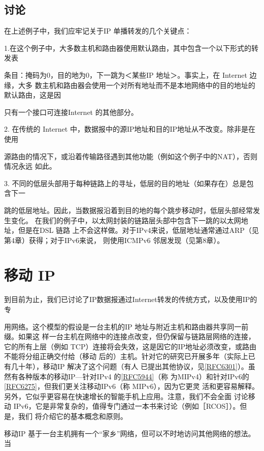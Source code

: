 \subsection{讨论}
在上述例子中，我们应牢记关于IP 单播转发的几个关键点：

1.在这个例子中，大多数主机和路由器使用默认路由，其中包含一个以下形式的转发表

条目：掩码为0，目的地为0，下一跳为＜某些IP 地址＞。事实上，在 Internet 边缘，大多
数主机和路由器会使用一个对所有地址而不是本地网络中的目的地址的默认路由，这是因

只有一个接口可连接Internet 的其他部分。

2. 在传统的 Internet 中，数据报中的源IP地址和目的IP地址从不改变。除非是在使用

源路由的情况下，或沿着传输路径遇到其他功能（例如这个例子中的NAT），否则情况永远
如此。

3. 不同的低层头部用于每种链路上的寻址，低层的目的地址（如果存在）总是包含下一

跳的低层地址。因此，当数据报沿着到目的地的每个跳步移动时，低层头部经常发生变化。
在我们的例子中，以太网封装的链路层头部中包含下一跳的以太网地址，但是在DSL 链路
上不会这样做。对于IPv4来说，低层地址通常通过ARP（见第4章）获得；对于IPv6来说，
则使用ICMPv6 邻居发现（见第8章）。

\section{移动 IP}
到目前为止，我们已讨论了IP数据报通过Internet转发的传统方式，以及使用IP的专

用网络。这个模型的假设是一台主机的IP 地址与附近主机和路由器共享同一前缀。如果这
样一台主机在网络中的连接点改变，但仍保留与链路层网络的连接，它的所有上层（例如
TCP）连接将会失效，这是因它的IP地址必须改变，或路由不能将分组正确交付给（移动
后的）主机。针对它的研究已开展多年（实际上已有几十年），移动IP 解决了这个问题（有人
已提出其他协议，见\href{https://www.rfc-editor.org/rfc/rfc6301}{[RFC6301]}）。虽然有各种版本的移动IP—针对IPv4 的\href{https://www.rfc-editor.org/rfc/rfc5944}{[RFC5944]}（称
为MIPv4）和针对IPv6的\href{https://www.rfc-editor.org/rfc/rfc6275}{[RFC6275]}，但我们更关注移动IPv6（称 MIPv6），因为它更灵
活和更容易解释。另外，它似乎更容易在快速增长的智能手机上应用。注意，我们不会全面
讨论移动 IPv6，它是非常复杂的，值得专门通过一本书来讨论（例如［RCOS］）。但是，我们
将介绍它的基本概念和原则。

移动IP 基于一台主机拥有一个“家乡”网络，但可以不时地访问其他网络的想法。当

